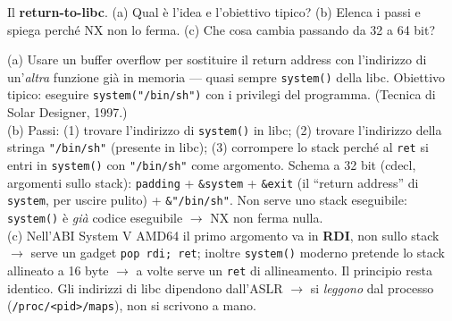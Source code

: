 \question[6]
Il \textbf{return-to-libc}. (a) Qual è l'idea e l'obiettivo tipico? (b) Elenca i passi e spiega perché NX non lo ferma. (c) Che cosa cambia passando da 32 a 64 bit?
\begin{solution}
(a) Usare un buffer overflow per sostituire il return address con l'indirizzo di un'\emph{altra} funzione già in memoria --- quasi sempre \lstinline|system()| della libc. Obiettivo tipico: eseguire \lstinline|system("/bin/sh")| con i privilegi del programma. (Tecnica di Solar Designer, 1997.)\\
(b) Passi: (1) trovare l'indirizzo di \lstinline|system()| in libc; (2) trovare l'indirizzo della stringa \lstinline|"/bin/sh"| (presente in libc); (3) corrompere lo stack perché al \lstinline|ret| si entri in \lstinline|system()| con \lstinline|"/bin/sh"| come argomento. Schema a 32 bit (cdecl, argomenti sullo stack): \lstinline|padding| + \lstinline|&system| + \lstinline|&exit| (il ``return address'' di \lstinline|system|, per uscire pulito) + \lstinline|&"/bin/sh"|. Non serve uno stack eseguibile: \lstinline|system()| è \emph{già} codice eseguibile $\to$ NX non ferma nulla.\\
(c) Nell'ABI System V AMD64 il primo argomento va in \textbf{RDI}, non sullo stack $\to$ serve un gadget \lstinline|pop rdi; ret|; inoltre \lstinline|system()| moderno pretende lo stack allineato a 16 byte $\to$ a volte serve un \lstinline|ret| di allineamento. Il principio resta identico. Gli indirizzi di libc dipendono dall'ASLR $\to$ si \emph{leggono} dal processo (\lstinline|/proc/<pid>/maps|), non si scrivono a mano.
\end{solution}
